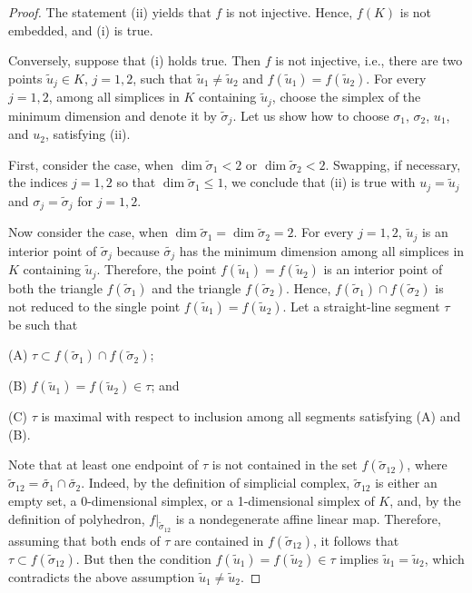 \documentclass[12pt, reqno]{amsart}
\begin{document}
\begin{proof}
The statement (ii) yields that
$f$ 
is not injective. 
Hence, 
$f(K)$ 
is not embedded, and (i) is true.

Conversely, suppose that (i) holds true.
Then
$f$ 
is not injective, i.e., there are two points 
$\widetilde{u}_j\in K$, $j=1,2$,
such that 
$\widetilde{u}_1\neq \widetilde{u}_2$ 
and 
$f(\widetilde{u}_1)=f(\widetilde{u}_2)$.
For every 
$j=1,2$, 
among all simplices in 
$K$
containing  
$\widetilde{u}_j$,
choose the simplex of the minimum dimension and denote it by 
$\widetilde{\sigma}_j$.
Let us show how to choose
$\sigma_1$, $\sigma_2$, $u_1$, and $u_2$, 
satisfying (ii).

First, consider the case, when 
$\dim \widetilde{\sigma}_1<2$
or 
$\dim \widetilde{\sigma}_2<2$.
Swapping, if necessary, the indices 
$j=1,2$ 
so that 
$\dim\widetilde{\sigma}_1\leqslant 1$, 
we conclude that (ii) is true with
$u_j=\widetilde{u}_j$
and
$\sigma_j=\widetilde{\sigma}_j$
for 
$j=1,2$.

Now consider the case, when 
$\dim\widetilde{\sigma}_1=\dim\widetilde{\sigma}_2=2$.
For every 
$j=1,2$, 
$\widetilde{u}_j$
is an interior point of
$\widetilde{\sigma}_j$ 
because
$\widetilde{\sigma_j}$
has the minimum dimension among all simplices in 
$K$
containing  
$\widetilde{u}_j$.
Therefore, the point 
$f(\widetilde{u}_1)=f(\widetilde{u}_2)$ 
is an interior point of both the triangle 
$f(\widetilde{\sigma}_1)$ 
and the triangle 
$f(\widetilde{\sigma}_2)$.
Hence, 
$f(\widetilde{\sigma}_1)\cap f(\widetilde{\sigma}_2)$
is not reduced to the single point
$f(\widetilde{u}_1)=f(\widetilde{u}_2)$.
Let a straight-line segment 
$\tau$
be such that 

(A) 
$\tau\subset f(\widetilde{\sigma}_1)\cap f(\widetilde{\sigma}_2)$;

(B) 
$f(\widetilde{u}_1)=f(\widetilde{u}_2)\in \tau$;  
and 

(C) 
$\tau$ 
is maximal with respect to inclusion among all segments satisfying (A) and (B).

Note that at least one endpoint of  
$\tau$ 
is not contained in the set
$f(\widetilde{\sigma}_{12})$,
where 
$\widetilde{\sigma}_{12}=\widetilde{\sigma_1}\cap\widetilde{\sigma_2}$.
Indeed, by the definition of simplicial complex, 
$\widetilde{\sigma}_{12}$ 
is either an empty set, a 0-dimensional simplex, or a 1-dimensional simplex of 
$K$, 
and, 
by the definition of polyhedron, 
$f\vert_{\widetilde{\sigma}_{12}}$
is a nondegenerate affine linear map.
Therefore, assuming that both ends of  
$\tau$ 
are contained in  
$f(\widetilde{\sigma}_{12})$, 
it follows that  
$\tau\subset f(\widetilde{\sigma}_{12})$.
But then the condition 
$f(\widetilde{u}_1)=f(\widetilde{u}_2)\in \tau$ 
implies 
$\widetilde{u}_1=\widetilde{u}_2$, 
which contradicts the above assumption 
$\widetilde{u}_1\neq\widetilde{u}_2$.


\end{proof}
\end{document}
